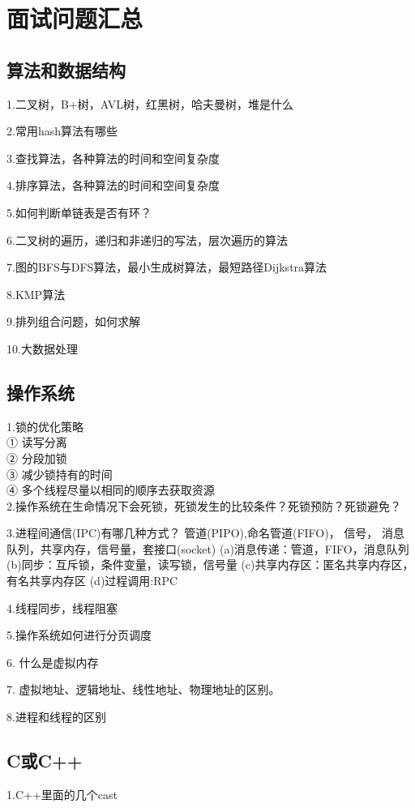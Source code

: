 \section{面试问题汇总}

\subsection{算法和数据结构}
1.二叉树，B+树，AVL树，红黑树，哈夫曼树，堆是什么

2.常用hash算法有哪些

3.查找算法，各种算法的时间和空间复杂度

4.排序算法，各种算法的时间和空间复杂度

5.如何判断单链表是否有环？

6.二叉树的遍历，递归和非递归的写法，层次遍历的算法

7.图的BFS与DFS算法，最小生成树算法，最短路径Dijkstra算法

8.KMP算法

9.排列组合问题，如何求解

10.大数据处理

\subsection{操作系统}
1.锁的优化策略\\
① 读写分离\\
② 分段加锁\\
③ 减少锁持有的时间\\
④ 多个线程尽量以相同的顺序去获取资源\\

2.操作系统在生命情况下会死锁，死锁发生的比较条件？死锁预防？死锁避免？

3.进程间通信(IPC)有哪几种方式？
管道(PIPO),命名管道(FIFO)， 信号， 消息队列，共享内存，信号量，套接口(socket)
(a)消息传递：管道，FIFO，消息队列
(b)同步：互斥锁，条件变量，读写锁，信号量
(c)共享内存区：匿名共享内存区，有名共享内存区
(d)过程调用:RPC

4.线程同步，线程阻塞

5.操作系统如何进行分页调度

6. 什么是虚拟内存

7. 虚拟地址、逻辑地址、线性地址、物理地址的区别。

8.进程和线程的区别
\subsection{C或C++}
1.C++里面的几个cast

